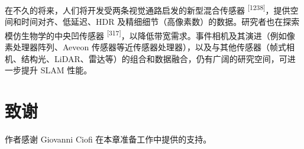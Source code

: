 在不久的将来，人们将开发受两条视觉通路启发的新型混合传感器 \textsuperscript{[1238]}，提供空间和时间对齐、低延迟、HDR 及精细细节（高像素数）的数据。研究者也在探索模仿生物学的中央凹传感器 \textsuperscript{[317]}，以降低带宽需求。事件相机及其演进（例如像素处理器阵列、Aeveon 传感器等近传感器处理器），以及与其他传感器（帧式相机、结构光、LiDAR、雷达等）的组合和数据融合，仍有广阔的研究空间，可进一步提升 SLAM 性能。

\section{致谢}

作者感谢 Giovanni Ciofi 在本章准备工作中提供的支持。
